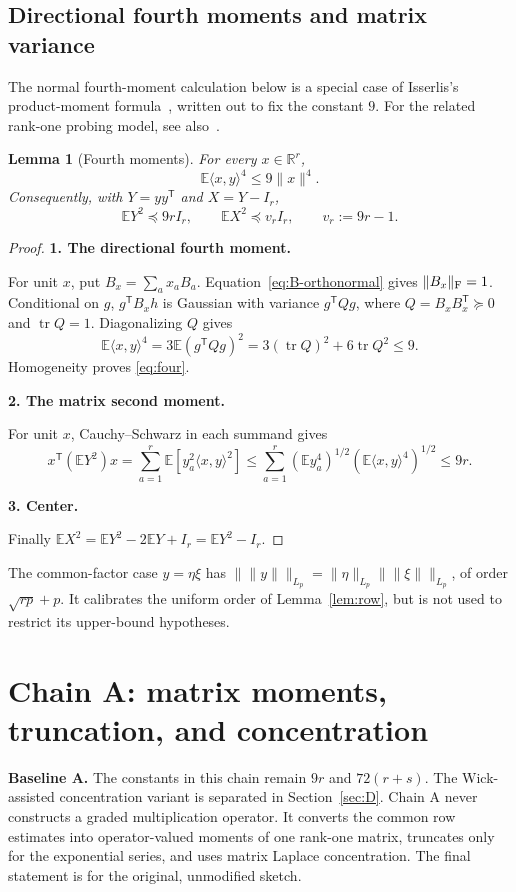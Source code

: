 \documentclass[11pt]{article}
\numberwithin{equation}{section}
\newtheorem{lemma}[theorem]{Lemma}
\theoremstyle{definition}\newtheorem{definition}[theorem]{Definition}
\theoremstyle{remark}\newtheorem{remark}[theorem]{Remark}
\newcommand{\R}{\mathbb R}\newcommand{\E}{\mathbb E}\newcommand{\Prob}{\mathbb P}
\newcommand{\tr}{\operatorname{tr}}\newcommand{\Ent}{\operatorname{Ent}}
\newcommand{\norm}[1]{\lVert#1\rVert}\newcommand{\ip}[2]{\langle#1,#2\rangle}
\newcommand{\step}[1]{\par\addvspace{.65\baselineskip}\Needspace{4\baselineskip}\noindent\textbf{#1}\par\nobreak\smallskip}
\begin{document}
\subsection{Directional fourth moments and matrix variance}
The normal fourth-moment calculation below is a special case of Isserlis's
product-moment formula~\cite{Isserlis}, written out to fix the constant $9$.
For the related rank-one probing model, see also~\cite{BK}.
\begin{lemma}[Fourth moments]\label{lem:four}
For every $x\in\R^r$,
\begin{equation}\label{eq:four}
 \E\ip{x}{y}^4\le9\norm x^4.
\end{equation}
Consequently, with $Y=yy^{\mathsf T}$ and $X=Y-I_r$,
\begin{equation}\label{eq:variance}
 \E Y^2\preceq9rI_r,\qquad
 \E X^2\preceq v_r I_r,\qquad v_r:=9r-1.
\end{equation}
\end{lemma}
\begin{proof}
\step{1. The directional fourth moment.}
For unit $x$, put $B_x=\sum_a x_aB_a$. Equation~\eqref{eq:B-orthonormal} gives
$\norm{B_x}_\F=1$. Conditional on $g$, $g^{\mathsf T}B_xh$ is Gaussian with
variance $g^{\mathsf T}Qg$, where $Q=B_xB_x^{\mathsf T}\succeq0$ and $\tr Q=1$.
Diagonalizing $Q$ gives
\[
 \E\ip{x}{y}^4=3\E(g^{\mathsf T}Qg)^2
 =3(\tr Q)^2+6\tr Q^2\le9.
\]
Homogeneity proves \eqref{eq:four}.

\step{2. The matrix second moment.}
For unit $x$, Cauchy--Schwarz in each summand gives
\[
 x^{\mathsf T}(\E Y^2)x
 =\sum_{a=1}^r\E[y_a^2\ip{x}{y}^2]
 \le\sum_{a=1}^r(\E y_a^4)^{1/2}(\E\ip{x}{y}^4)^{1/2}
 \le9r.
\]

\step{3. Center.}
Finally $\E X^2=\E Y^2-2\E Y+I_r=\E Y^2-I_r$.
\end{proof}
The common-factor case $y=\eta\xi$ has
$\|\norm y\|_{L_p}=\|\eta\|_{L_p}\|\norm\xi\|_{L_p}$, of order
$\sqrt{rp}+p$. It calibrates the uniform order of Lemma~\ref{lem:row}, but is not
used to restrict its upper-bound hypotheses.

\clearpage
\section{Chain A: matrix moments, truncation, and concentration}\label{sec:A}
\begin{takeaway}
\textbf{Baseline A.} The constants in this chain remain $9r$ and $72(r+s)$.
The Wick-assisted concentration variant is separated in Section~\ref{sec:D}.
Chain A never constructs a graded multiplication operator. It converts the common
row estimates into operator-valued moments of one rank-one matrix, truncates only
for the exponential series, and uses matrix Laplace concentration. The final
statement is for the original, unmodified sketch.
\end{takeaway}
\end{document}
